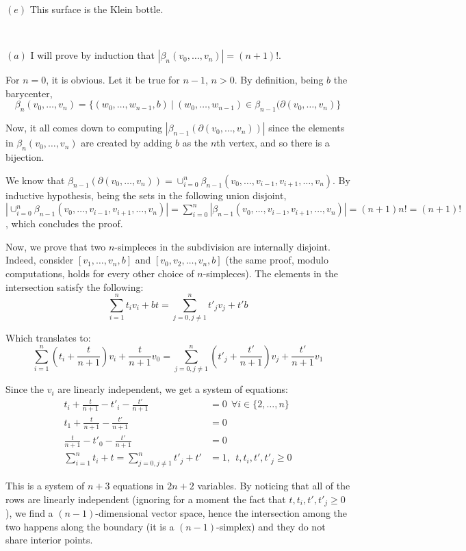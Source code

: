 \documentclass{article}
\newcommand{\exercise}[1]{\noindent {\bf Exercise #1}}
\begin{document}
$(e)$ This surface is the Klein bottle.


~\\
\exercise{2}

$(a)$ I will prove by induction that $|\beta_n(v_0,\ldots,v_n)|=(n+1)!$.

For $n=0$, it is obvious. Let it be true for $n-1$, $n>0$. By definition, being $b$ the barycenter,$$\beta_{n}(v_0,\ldots,v_n)=\{(w_0,\ldots,w_{n-1},b)\ |\ (w_0,\ldots,w_{n-1})\in\beta_{n-1}(\partial(v_0,\ldots,v_n)\}$$

Now, it all comes down to computing $|\beta_{n-1}(\partial(v_0,\ldots,v_n))|$ since the elements in $\beta_{n}(v_0,\ldots,v_n)$ are created by adding $b$ as the $n$th vertex, and so there is a bijection.

We know that $\beta_{n-1}(\partial(v_0,\ldots,v_n))=\cup_{i=0}^n\beta_{n-1}(v_0,\ldots,v_{i-1},v_{i+1},\ldots,v_n)$. By inductive hypothesis, being the sets in the following union disjoint, $|\cup_{i=0}^n\beta_{n-1}(v_0,\ldots,v_{i-1},v_{i+1},\ldots,v_n)|=\sum_{i=0}^n|\beta_{n-1}(v_0,\ldots,v_{i-1},v_{i+1},\ldots,v_n)|=(n+1)n!=(n+1)!$, which concludes the proof.

Now, we prove that two $n$-simpleces in the subdivision are internally disjoint. Indeed, consider $[v_1,\ldots,v_n,b]$ and $[v_0,v_2,\ldots,v_n,b]$ (the same proof, modulo computations, holds for every other choice of $n$-simpleces). The elements in the intersection satisfy the following:$$\sum_{i=1}^n t_iv_i+bt=\sum_{j=0,j\neq 1}^n t'_jv_j+t'b$$

Which translates to:$$\sum_{i=1}^n (t_i+\frac{t}{n+1})v_i+\frac{t}{n+1}v_0=\sum_{j=0,j\neq 1}^n (t'_j+\frac{t'}{n+1})v_j+\frac{t'}{n+1}v_1$$

Since the $v_i$ are linearly independent, we get a system of equations:
\begin{align*}
		t_i+\frac{t}{n+1}-t'_i-\frac{t'}{n+1} & =0\ \ \forall i\in\{2,\ldots,n\} \\
		t_1+\frac{t}{n+1}-\frac{t'}{n+1} & =0 \\
		\frac{t}{n+1}-t'_0-\frac{t'}{n+1} & =0 \\
		\sum_{i=1}^n t_i+t=\sum_{j=0,j\neq 1}^n t'_j+t' & =1,\ \ t,t_i,t',t'_j\geq 0
\end{align*}

This is a system of $n+3$ equations in $2n+2$ variables. By noticing that all of the rows are linearly independent (ignoring for a moment the fact that $t,t_i,t',t'_j\geq 0$), we find a $(n-1)$-dimensional vector space, hence the intersection among the two happens along the boundary (it is a $(n-1)$-simplex) and they do not share interior points.
\end{document}
